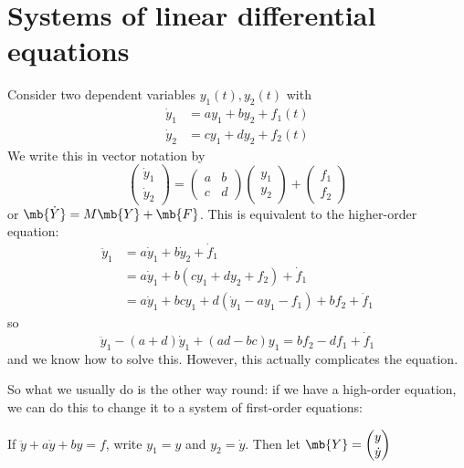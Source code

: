 \documentclass[a4paper]{article}
\begin{document}
\section{Systems of linear differential equations}
Consider two dependent variables $y_1(t), y_2(t)$ with
\begin{align*}
  \dot y_1 &= ay_1 + by_2 + f_1(t)\\
  \dot y_2 &= cy_1 + dy_2 + f_2(t)
\end{align*}
We write this in vector notation by 
\[
\begin{pmatrix}
  \dot y_1\\\dot y_2 
\end{pmatrix} = 
\begin{pmatrix}
  a & b\\
  c & d
\end{pmatrix}
\begin{pmatrix}
  y_1\\y_2
\end{pmatrix} + 
\begin{pmatrix}
   f_1\\f_2
\end{pmatrix}
\]
or $\mb{\dot Y} = M\mb{Y} + \mb{F}$. This is equivalent to the higher-order equation:
\begin{align*}
  \ddot y_1 &= a\dot y_1 + b\dot y_2 + \dot f_1\\
  &= a\dot y_1 + b(cy_1 + dy_2 + f_2) + \dot f_1\\
  &= a\dot y_1 + bcy_1 + d(\dot y_1 - ay_1 - f_1) + bf_2 + \dot f_1
\end{align*}
so
\[
\ddot y_1 - (a + d)\dot y_1 + (ad - bc) y_1 = bf_2 - df_1 + \dot f_1
\]
and we know how to solve this. However, this actually complicates the equation.

So what we usually do is the other way round: if we have a high-order equation, we can do this to change it to a system of first-order equations:

If $\ddot y + a\dot y + by = f$, write $y_1 = y$ and $y_2 = \dot y$. Then let $\mb{Y} = 
\begin{pmatrix}
  y\\\dot y
\end{pmatrix}$
\end{document}
